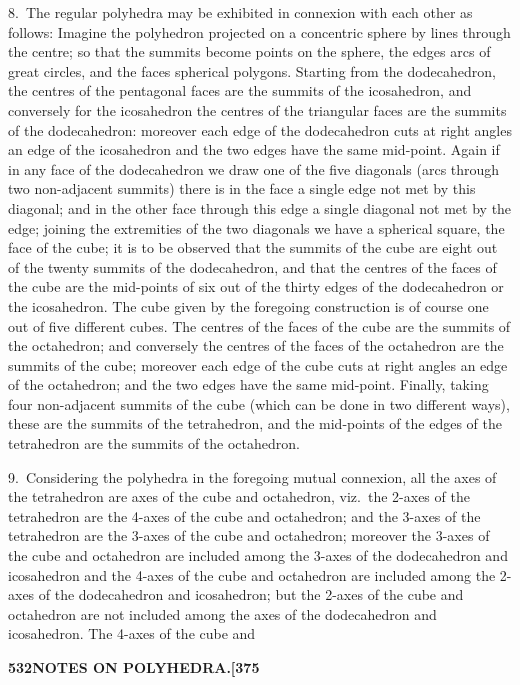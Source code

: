 \documentclass[11pt,a4paper]{article}
\begin{document}
8.~The regular polyhedra may be exhibited in connexion with each other as follows: Imagine the polyhedron projected on a concentric sphere by lines through the centre; so that the summits become points on the sphere, the edges arcs of great circles, and the faces spherical polygons. Starting from the dodecahedron, the centres of the pentagonal faces are the summits of the icosahedron, and conversely for the icosahedron the centres of the triangular faces are the summits of the dodecahedron: moreover each edge of the dodecahedron cuts at right angles an edge of the icosahedron and the two edges have the same mid-point. Again if in any face of the dodecahedron we draw one of the five diagonals (arcs through two non-adjacent summits) there is in the face a single edge not met by this diagonal; and in the other face through this edge a single diagonal not met by the edge; joining the extremities of the two diagonals we have a spherical square, the face of the cube; it is to be observed that the summits of the cube are eight out of the twenty summits of the dodecahedron, and that the centres of the faces of the cube are the mid-points of six out of the thirty edges of the dodecahedron or the icosahedron. The cube given by the foregoing construction is of course one out of five different cubes. The centres of the faces of the cube are the summits of the octahedron; and conversely the centres of the faces of the octahedron are the summits of the cube; moreover each edge of the cube cuts at right angles an edge of the octahedron; and the two edges have the same mid-point. Finally, taking four non-adjacent summits of the cube (which can be done in two different ways), these are the summits of the tetrahedron, and the mid-points of the edges of the tetrahedron are the summits of the octahedron.

9.~Considering the polyhedra in the foregoing mutual connexion, all the axes of the tetrahedron are axes of the cube and octahedron, viz.~the 2-axes of the tetrahedron are the 4-axes of the cube and octahedron; and the 3-axes of the tetrahedron are the 3-axes of the cube and octahedron; moreover the 3-axes of the cube and octahedron are included among the 3-axes of the dodecahedron and icosahedron and the 4-axes of the cube and octahedron are included among the 2-axes of the dodecahedron and icosahedron; but the 2-axes of the cube and octahedron are not included among the axes of the dodecahedron and icosahedron. The 4-axes of the cube and

\newpage
\noindent\textbf{532\hspace{1em}NOTES ON POLYHEDRA.\hfill[375}
\end{document}
